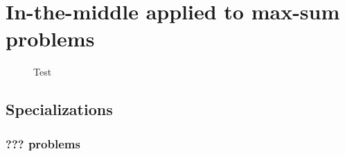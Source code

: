 \section{In-the-middle applied to max-sum problems}

\begin{figure}
	\subfloat[Test]{}
	\caption{Test}
\end{figure}

\subsection{Specializations}

\subsubsection{??? problems}
